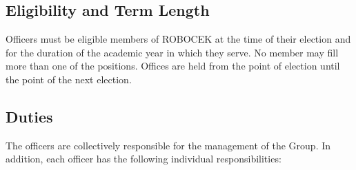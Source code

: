 \subsection{Eligibility and Term Length}
Officers must be eligible members of ROBOCEK at the time of their election and for the duration of the academic year in which they serve. No member may fill more than one of the positions. Offices are held from the point of election until the point of the next election.

\subsection{Duties}
The officers are collectively responsible for the management of the Group. In addition, each officer has the following individual responsibilities: 

